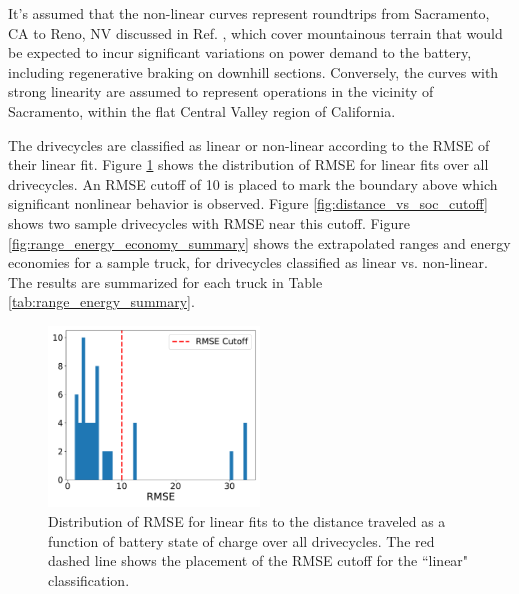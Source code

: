 It's assumed that the non-linear curves represent roundtrips from Sacramento, CA to Reno, NV discussed in Ref. \cite{NACFE_2023}, which cover mountainous terrain that would be expected to incur significant variations on power demand to the battery, including regenerative braking on downhill sections. Conversely, the curves with strong linearity are assumed to represent operations in the vicinity of Sacramento, within the flat Central Valley region of California. 

The drivecycles are classified as linear or non-linear according to the RMSE of their linear fit. Figure \ref{fig:rmse_dist} shows the distribution of RMSE for linear fits over all drivecycles. An RMSE cutoff of 10 is placed to mark the boundary above which significant nonlinear behavior is observed. Figure \ref{fig:distance_vs_soc_cutoff} shows two sample drivecycles with RMSE near this cutoff. Figure \ref{fig:range_energy_economy_summary} shows the extrapolated ranges and energy economies for a sample truck, for drivecycles classified as linear vs. non-linear. The results are summarized for each truck in Table \ref{tab:range_energy_summary}. 

\begin{figure}[H]
        \centering
        \includegraphics[width=0.5\textwidth]{figures/all_RMSE.pdf}
        \caption{Distribution of RMSE for linear fits to the distance traveled as a function of battery state of charge over all drivecycles. The red dashed line shows the placement of the RMSE cutoff for the ``linear" classification.}
        \label{fig:rmse_dist}
\end{figure}

